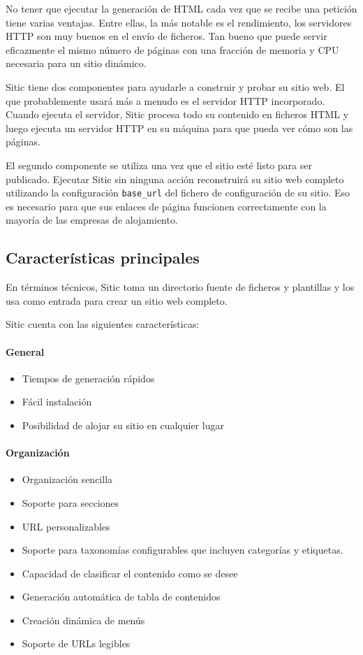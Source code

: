 \documentclass[a4paper,12pt]{article}
\begin{document}
No tener que ejecutar la generación de HTML cada vez que se recibe una petición tiene varias ventajas. Entre ellas,
la más notable es el rendimiento, los servidores HTTP son muy buenos en el envío de ficheros. Tan bueno que puede
servir eficazmente el mismo número de páginas con una fracción de memoria y CPU necesaria para un sitio dinámico.

Sitic tiene dos componentes para ayudarle a construir y probar su sitio web. El que probablemente usará más a menudo es el
servidor HTTP incorporado. Cuando ejecuta el servidor, Sitic procesa todo su contenido en ficheros HTML y luego ejecuta
un servidor HTTP en su máquina para que pueda ver cómo son las páginas.

El segundo componente se utiliza una vez que el sitio esté listo para ser publicado.
Ejecutar Sitic sin ninguna acción reconstruirá su sitio web completo utilizando la configuración \texttt{base\_url}
del fichero de configuración de su sitio. Eso es necesario para que sus enlaces de página funcionen correctamente
con la mayoría de las empresas de alojamiento.

\subsection{Características principales}

En términos técnicos, Sitic toma un directorio fuente de ficheros
y plantillas y los usa como entrada para crear un sitio web completo.

Sitic cuenta con las siguientes características:

\paragraph{General}

\begin{itemize}
\item Tiempos de generación rápidos
\item Fácil instalación
\item Posibilidad de alojar su sitio en cualquier lugar
\end{itemize}

\paragraph{Organización}

\begin{itemize}
\item Organización sencilla
\item Soporte para secciones
\item URL personalizables
\item Soporte para taxonomías configurables que incluyen categorías y etiquetas.
\item Capacidad de clasificar el contenido como se desee
\item Generación automática de tabla de contenidos
\item Creación dinámica de menús
\item Soporte de URLs legibles
\end{itemize}
\end{document}
